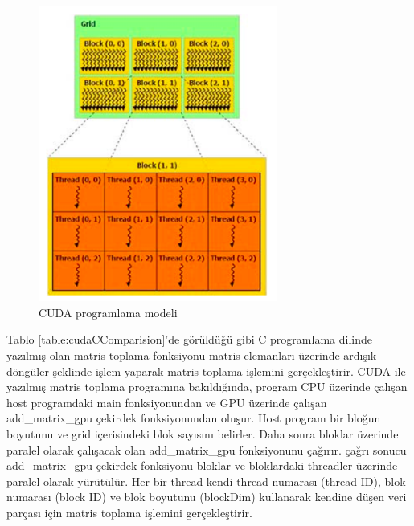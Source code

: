 \begin{figure}[h]
\centering
\shorthandoff{=}
\includegraphics[width=0.7\textwidth]{gorsel/cudaProgrammingStructure.png}
\shorthandoff{=}
\caption{CUDA programlama modeli}
\label{cudaProgrammingStructure}
\end{figure}






Tablo \ref{table:cudaCComparision}’de görüldüğü gibi C programlama dilinde yazılmış olan matris toplama fonksiyonu matris elemanları üzerinde ardışık döngüler şeklinde işlem yaparak matris toplama işlemini gerçekleştirir. CUDA ile yazılmış matris toplama programına bakıldığında, program CPU üzerinde çalışan host programdaki main fonksiyonundan ve GPU üzerinde çalışan add\_matrix\_gpu çekirdek fonksiyonundan oluşur. Host program bir bloğun boyutunu ve grid içerisindeki blok sayısını belirler. Daha sonra bloklar üzerinde paralel olarak çalışacak olan add\_matrix\_gpu fonksiyonunu çağırır. çağrı sonucu add\_matrix\_gpu çekirdek fonksiyonu bloklar ve bloklardaki threadler üzerinde paralel olarak yürütülür. Her bir thread kendi thread numarası (thread ID), blok numarası (block ID) ve blok boyutunu (blockDim) kullanarak kendine düşen veri parçası için matris toplama işlemini gerçekleştirir. \par


